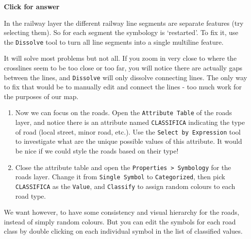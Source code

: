 \documentclass[
  letterpaper,
  DIV=11,
  numbers=noendperiod]{scrreprt}
\begin{document}
\begin{tcolorbox}[enhanced jigsaw, leftrule=.75mm, colframe=quarto-callout-important-color-frame, breakable, toprule=.15mm, bottomrule=.15mm, arc=.35mm, rightrule=.15mm, opacityback=0, colback=white, left=2mm]

\vspace{-3mm}\textbf{Click for answer}\vspace{3mm}

In the railway layer the different railway line segments are separate
features (try selecting them). So for each segment the symbology is
`restarted'. To fix it, use the \texttt{Dissolve} tool to turn all line
segments into a single multiline feature.

It will solve most problems but not all. If you zoom in very close to
where the crosslines seem to be too close or too far, you will notice
there are actually gaps between the lines, and \texttt{Dissolve} will
only dissolve connecting lines. The only way to fix that would be to
manually edit and connect the lines - too much work for the purposes of
our map.

\end{tcolorbox}

\begin{enumerate}
\def\labelenumi{(\arabic{enumi})}
\setcounter{enumi}{213}
\item
  Now we can focus on the roads. Open the \texttt{Attribute\ Table} of
  the roads layer, and notice there is an attribute named
  \texttt{CLASSIFICA} indicating the type of road (local street, minor
  road, etc.). Use the \texttt{Select\ by\ Expression} tool to
  investigate what are the unique possible values of this attribute. It
  would be nice if we could style the roads based on their type!
\item
  Close the attribute table and open the
  \texttt{Properties\ \textgreater{}\ Symbology} for the roads layer.
  Change it from \texttt{Single\ Symbol} to \texttt{Categorized}, then
  pick \texttt{CLASSIFICA} as the \texttt{Value}, and \texttt{Classify}
  to assign random colours to each road type.
\end{enumerate}

We want however, to have some consistency and visual hierarchy for the
roads, instead of simply random colours. But you can edit the symbols
for each road class by double clicking on each individual symbol in the
list of classified values.
\end{document}
